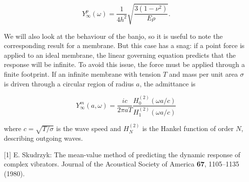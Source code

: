   $$Y_\infty^{p} (\omega)=\frac{1}{4h^2} \sqrt{\frac{3(1-\nu^2)}{E \rho}} . 
  \tag{2}$$ 

  We will also look at the behaviour of the banjo, so it is useful to note the 
  corresponding result for a membrane. But this case has a snag: if a point 
  force is applied to an ideal membrane, the linear governing equation predicts 
  that the response will be infinite. To avoid this issue, the force must be 
  applied through a finite footprint. If an infinite membrane with tension $T$ 
  and mass per unit area $\sigma$ is driven through a circular region of radius 
  $a$, the admittance is 

  $$Y_\infty^{m} (a,\omega)=\frac{ic}{2 \pi a T} \frac{H^{(2)}_0 (\omega 
  a/c)}{H^{(2)}_1 (\omega a/c)} \tag{3}$$ 

  where $c=\sqrt{T/\sigma}$ is the wave speed and $H^{(2)}_N$ is the Hankel 
  function of order $N$, describing outgoing waves. 

  \sectionreferences{}[1] E. Skudrzyk: The mean-value method of predicting the 
  dynamic response of complex vibrators. Journal of the Acoustical Society of 
  America \textbf{67}, 1105–1135 (1980). 